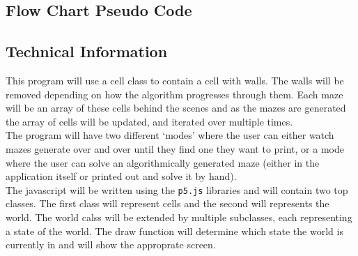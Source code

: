 \documentclass[12 pt]{article}
\begin{document}
\subsection{Flow Chart Pseudo Code}

\subsection{Technical Information}
\hspace{\parindent} This program will use a cell class to contain a cell with walls. The walls will be removed depending on how the algorithm progresses through them. Each maze will be an array of these cells behind the scenes and as the mazes are generated the array of cells will be updated, and iterated over multiple times. \\
\hspace*{\parindent} The program will have two different `modes' where the user can either watch mazes generate over and over until they find one they want to print, or a mode where the user can solve an algorithmically generated maze (either in the application itself or printed out and solve it by hand). \\
\hspace*{\parindent} The javascript will be written using the \verb|p5.js| libraries and will contain two top classes. The first class will represent cells and the second will represents the world. The world calss will be extended by multiple subclasses, each representing a state of the world. The draw function will determine which state the world is currently in and will show the approprate screen. 
\end{document}
